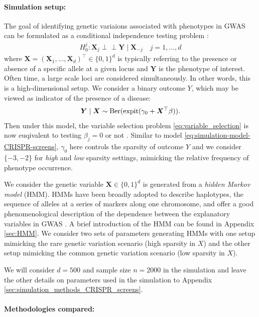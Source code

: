 \documentclass[12pt]{article}
\theoremstyle{definition}
\newcommand{\indep}{\perp \!\!\! \perp}
\newcommand{\expit}{\mathrm{expit}}                 	%
\newcommand{\prx}{\bm X}								%
\newcommand{\pry}{{\bm Y}}								%
\begin{document}
\paragraph{Simulation setup:}

The goal of identifying genetic variaions associated with phenotypes in GWAS can be formulated as a conditional independence testing problem \citep{sesia2019gene}:
\begin{align}\label{eq:variable_selection}
  H_0^j:\prx_j\indep \pry\mid \prx_{-j}\quad j=1,\ldots,d
\end{align}
where $\prx=(\prx_1,\ldots,\prx_d)^\top\in\{0,1\}^d$ is typically referring to the presence or absence of a specific allele at a given locus and $\pry$ is the phenotype of interest. Often time, a large scale loci are considered simultaneously. In other words, this is a high-dimensional setup. We consider a binary outcome $Y$, which may be viewed as indicator of the presence of a disease:
\begin{align*}
	\bm Y \mid \bm X\sim \textnormal{Ber}(\expit(\gamma_0 + \prx^\top \beta)).
\end{align*}
Then under this model, the variable selection problem \eqref{eq:variable_selection} is now euqivalent to testing $\beta_j=0$ or not \citep{CetL16}. Similar to model \eqref{eq:simulation-model-CRISPR-screens}, $\gamma_0$ here controls the sparsity of outcome $Y$ and we consider $\{-3,-2\}$ for \textit{high} and \textit{low} sparsity settings, mimicking the relative frequency of phenotype occurrence. 

We consider the genetic variable $\prx \in\{0,1\}^{d}$ is generated from a \textit{hidden Markov model} (HMM). HMMs have been broadly adopted to describe haplotypes, the sequence of alleles at a series of markers along one chromosome, and offer a good phenomenological description of the dependence between the explanatory variables in GWAS \citep{scheet2006fast,marchini2007new,browning2007rapid}. A brief introduction of the HMM can be found in Appendix \ref{sec:HMM}. We consider two sets of parameters generating HMMs with one setup mimicking the rare genetic variation scenario (high sparsity in $X$) and the other setup mimicking the common genetic variation scenario (low sparsity in $X$). 

We will consider $d=500$ and sample size $n=2000$ in the simulation and leave the other details on parameters used in the simulation to Appendix \ref{sec:simulation_methods_CRISPR_screens}. 

\paragraph{Methodologies compared:}
\end{document}
